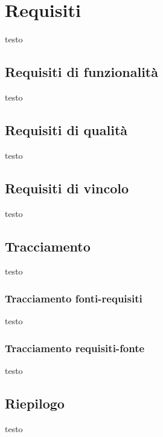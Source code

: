 \section{Requisiti}
testo

	\subsection{Requisiti di funzionalità}
	testo
	
	\subsection{Requisiti di qualità}
	testo
	
	\subsection{Requisiti di vincolo}
	testo
	
	\subsection{Tracciamento}
	testo
	
		\subsubsection{Tracciamento fonti-requisiti}
		testo
		
		\subsubsection{Tracciamento requisiti-fonte}
		testo
		
	\subsection{Riepilogo}
	testo